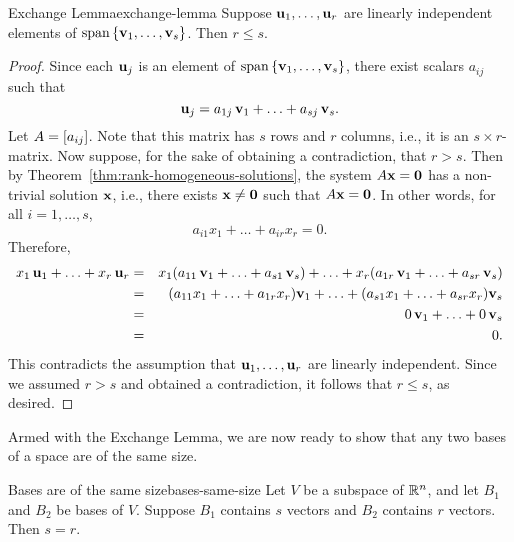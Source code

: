 \begin{lemma}{Exchange Lemma}{exchange-lemma}
  Suppose $\vect{u}_1,\ldots,\vect{u}_r$ are linearly independent
  elements of $\sspan\set{\vect{v}_1,\ldots,\vect{v}_s}$. Then
  $r\leq s$.
\end{lemma}

\begin{proof}
  Since each $\vect{u}_j$ is an element of
  $\sspan\set{\vect{v}_1,\ldots,\vect{v}_s}$, there exist
  scalars $a_{ij}$ such that
  \begin{equation*}
    \vect{u}_j = a_{1j}\,\vect{v}_1 + \ldots + a_{sj}\,\vect{v}_s.
  \end{equation*}
  Let $A = \left[a_{ij}\right]$. Note that this matrix has $s$ rows and $r$
  columns, i.e., it is an $s\times r$-matrix. Now suppose, for the
  sake of obtaining a contradiction, that $r>s$. Then by
  Theorem~\ref{thm:rank-homogeneous-solutions}, the system
  $A\vect{x}=\vect{0}$ has a non-trivial solution $\vect{x}$, i.e.,
  there exists $\vect{x}\neq\vect{0}$ such that $A\vect{x}=\vect{0}$.
  In other words, for all $i=1,\ldots,s$,
  \begin{equation*}
    a_{i1}x_1 + \ldots + a_{ir}x_r = 0.
  \end{equation*}
  Therefore,
  \begin{eqnarray*}
    x_1\,\vect{u}_1 + \ldots + x_r\,\vect{u}_r
    &=&
        x_1(a_{11}\,\vect{v}_1 + \ldots + a_{s1}\,\vect{v}_s)
        + \ldots
        + x_r(a_{1r}\,\vect{v}_1 + \ldots + a_{sr}\,\vect{v}_s)
    \\
    &=&
        (a_{11}x_1 + \ldots + a_{1r}x_r)\vect{v}_1
        + \ldots
        + (a_{s1}x_1 + \ldots + a_{sr}x_r)\vect{v}_s
    \\
    &=& 0\,\vect{v}_1 + \ldots + 0\,\vect{v}_s
    \\
    &=& 0.
  \end{eqnarray*}
  This contradicts the assumption that
  $\vect{u}_1,\ldots,\vect{u}_r$ are linearly independent. Since
  we assumed $r>s$ and obtained a contradiction, it follows that
  $r\leq s$, as desired.
\end{proof}

Armed with the Exchange Lemma, we are now ready to show that any two
bases of a space are of the same size.

\begin{theorem}{Bases are of the same size}{bases-same-size}
  Let $V$ be a subspace of\/ $\mathbb{R}^n$, and let $B_1$ and $B_2$ be
  bases of $V$. Suppose $B_1$ contains $s$ vectors and $B_2$ contains
  $r$ vectors. Then $s=r$.
\end{theorem}

